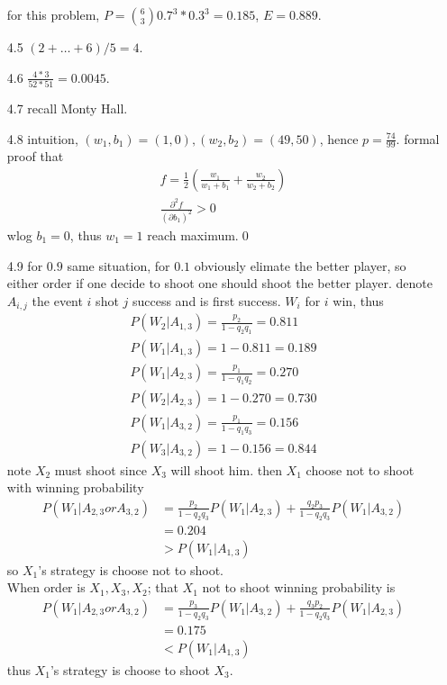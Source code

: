 \documentclass[paper=a4, fontsize=11pt]{scrartcl} %
\numberwithin{equation}{section} %
\numberwithin{figure}{section} %
\numberwithin{table}{section} %
\begin{document}
\begin{itemize}
	for this problem, $P= {6\choose 3} 0.7^3*0.3^3 = 0.185$, $E=0.889$.
	\item[4.5] $(2+\dots+6)/5= 4$.
	\item[4.6] $\frac{4*3}{52*51}= 0.0045$.
	\item[4.7] recall Monty Hall.
	\item[4.8] intuition, $(w_1,b_1)=(1,0), (w_2,b_2)=(49,50)$, hence $p=\frac{74}{99}$. formal proof that
	\begin{align}
		f = \frac{1}{2}(\frac{w_1}{w_1+b_1} + \frac{w_2}{w_2+b_2})\\
		\frac{\partial^2 f}{(\partial b_1)^2}> 0
	\end{align}
	wlog $b_1=0$, thus $w_1=1$ reach maximum.\qed
	\item[4.9] for $0.9$ same situation, for $0.1$ obviously elimate the better player, so either order if one decide to shoot one should shoot the better player. denote $A_{i,j}$ the event $i$ shot $j$ success and is first success. $W_i$ for $i$ win, thus
	\begin{align}
		P(W_2| A_{1,3}) = \frac{p_2}{1-q_2q_1} = 0.811\\
		P(W_1| A_{1,3}) = 1 -0.811= 0.189\\
		P(W_1| A_{2,3}) = \frac{p_1}{1-q_1q_2} = 0.270\\
		P(W_2| A_{2,3}) = 1 - 0.270 = 0.730\\
		P(W_1| A_{3,2}) = \frac{p_1}{1-q_1q_3} = 0.156\\
		P(W_3| A_{3,2}) = 1 - 0.156 = 0.844
	\end{align}
	note $X_2$ must shoot since $X_3$ will shoot him. then $X_1$ choose not to shoot with winning probability
	\begin{align}
		P(W_1 | A_{2,3} or A_{3,2}) &= \frac{p_2}{1-q_2q_3} P(W_1|A_{2,3}) + \frac{q_2p_3}{1-q_2q_3} P(W_1|A_{3,2}) \\
			&= 0.204\\
			&> P(W_1| A_{1,3})
	\end{align}
	so $X_1$'s strategy is choose not to shoot.\\
	When order is $X_1,X_3,X_2$; that $X_1$ not to shoot winning probability is 
	\begin{align}
		P(W_1 | A_{2,3} or A_{3,2}) &= \frac{p_3}{1-q_2q_3}P(W_1|A_{3,2}) + \frac{q_3p_2}{1-q_2q_3} P(W_1|A_{2,3}) \\
			&= 0.175\\
			&< P(W_1| A_{1,3})
	\end{align}
	thus $X_1$'s strategy is choose to shoot $X_3$.\\

\end{itemize}
\end{document}
